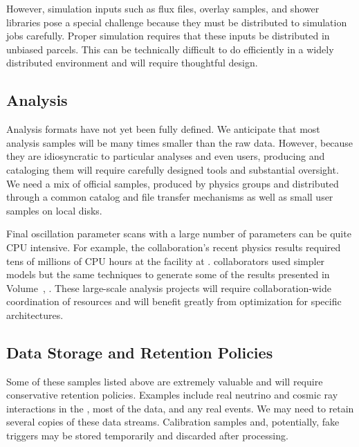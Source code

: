 However, simulation inputs such as flux files, overlay samples, and shower libraries pose a special challenge because they must be distributed to simulation jobs carefully.   Proper simulation requires that these inputs be distributed in unbiased parcels.  This can be technically difficult to do efficiently in a widely distributed environment and will require thoughtful design. 

\subsection{Analysis}
\label{sec:exec-comp-anal}

Analysis formats have not yet been fully defined.  We anticipate that most analysis samples will be many times smaller than the raw data.  However, because they are idiosyncratic to particular analyses and even users,  producing and cataloging them will require carefully designed tools and substantial oversight. 
We need a mix of official samples, produced by physics groups and distributed through a common catalog and file transfer mechanisms as well as small user samples on local disks. 

Final oscillation parameter scans with a large number of %
parameters can be quite CPU intensive.  For example, the  collaboration's recent physics results required tens of millions of  CPU hours at the  %
facility at .  collaborators used simpler models but the same techniques to generate some of the results presented in Volume~\volnumberphysics{}, \voltitlephysics{}. These large-scale analysis projects will require collaboration-wide coordination of resources and will benefit greatly from optimization for specific architectures.

\subsection{Data Storage and Retention Policies}
\label{sec:exec-comp-dsrp}

Some of these samples listed above are extremely valuable and will require conservative retention policies.   Examples include real neutrino and cosmic ray interactions in the , most of the  data, and any real  events.  We may need to retain several copies of these data streams. Calibration samples and, potentially, fake  triggers may be stored temporarily and discarded after processing. 

